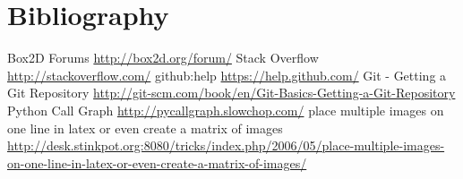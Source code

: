 \documentclass[a4paper,11pt]{article}
\begin{document}
\newpage
\section{Bibliography}

\begin{thebibliography}{9}


 Box2D Forums \url{http://box2d.org/forum/}
 Stack Overflow \url{http://stackoverflow.com/}
 github:help \url {https://help.github.com/}
 Git - Getting a Git Repository \url {http://git-scm.com/book/en/Git-Basics-Getting-a-Git-Repository}
 Python Call Graph \url {http://pycallgraph.slowchop.com/}
 place multiple images on one line in latex or even create a matrix of images \url{http://desk.stinkpot.org:8080/tricks/index.php/2006/05/place-multiple-images-on-one-line-in-latex-or-even-create-a-matrix-of-images/}

\end{thebibliography}
\end{document}
